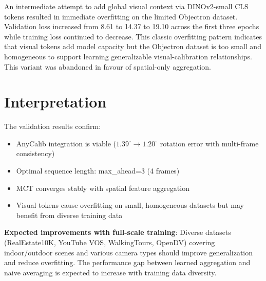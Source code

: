 An intermediate attempt to add global visual context via DINOv2-small CLS tokens resulted in immediate overfitting on the limited Objectron dataset. Validation loss increased from 8.61 to 14.37 to 19.10 across the first three epochs while training loss continued to decrease. This classic overfitting pattern indicates that visual tokens add model capacity but the Objectron dataset is too small and homogeneous to support learning generalizable visual-calibration relationships. This variant was abandoned in favour of spatial-only aggregation.

\section{Interpretation}\label{sec:app-interpretation}

The validation results confirm:
\begin{itemize}
    \item AnyCalib integration is viable ($1.39^\circ \to 1.20^\circ$ rotation error with multi-frame consistency)
    \item Optimal sequence length: max\_ahead=3 (4 frames)
    \item MCT converges stably with spatial feature aggregation
    \item Visual tokens cause overfitting on small, homogeneous datasets but may benefit from diverse training data
\end{itemize}

\textbf{Expected improvements with full-scale training}: Diverse datasets (RealEstate10K, YouTube VOS, WalkingTours, OpenDV) covering indoor/outdoor scenes and various camera types should improve generalization and reduce overfitting. The performance gap between learned aggregation and naive averaging is expected to increase with training data diversity.
